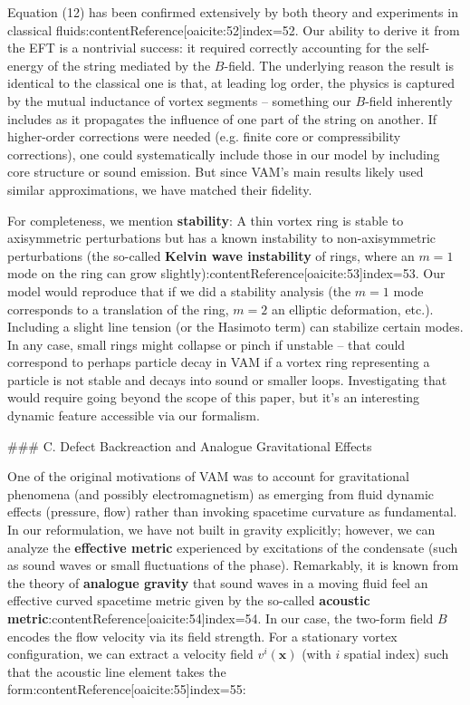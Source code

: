 \documentclass[12pt]{article}
\begin{document}
Equation (12) has been confirmed extensively by both theory and experiments in classical fluids:contentReference[oaicite:52]{index=52}. Our ability to derive it from the EFT is a nontrivial success: it required correctly accounting for the self-energy of the string mediated by the $B$-field. The underlying reason the result is identical to the classical one is that, at leading log order, the physics is captured by the mutual inductance of vortex segments – something our $B$-field inherently includes as it propagates the influence of one part of the string on another. If higher-order corrections were needed (e.g. finite core or compressibility corrections), one could systematically include those in our model by including core structure or sound emission. But since VAM’s main results likely used similar approximations, we have matched their fidelity.

For completeness, we mention \textbf{stability}: A thin vortex ring is stable to axisymmetric perturbations but has a known instability to non-axisymmetric perturbations (the so-called \textbf{Kelvin wave instability} of rings, where an $m=1$ mode on the ring can grow slightly):contentReference[oaicite:53]{index=53}. Our model would reproduce that if we did a stability analysis (the $m=1$ mode corresponds to a translation of the ring, $m=2$ an elliptic deformation, etc.). Including a slight line tension (or the Hasimoto term) can stabilize certain modes. In any case, small rings might collapse or pinch if unstable – that could correspond to perhaps particle decay in VAM if a vortex ring representing a particle is not stable and decays into sound or smaller loops. Investigating that would require going beyond the scope of this paper, but it’s an interesting dynamic feature accessible via our formalism.

### C. Defect Backreaction and Analogue Gravitational Effects

One of the original motivations of VAM was to account for gravitational phenomena (and possibly electromagnetism) as emerging from fluid dynamic effects (pressure, flow) rather than invoking spacetime curvature as fundamental. In our reformulation, we have not built in gravity explicitly; however, we can analyze the \textbf{effective metric} experienced by excitations of the condensate (such as sound waves or small fluctuations of the phase). Remarkably, it is known from the theory of \textbf{analogue gravity} that sound waves in a moving fluid feel an effective curved spacetime metric given by the so-called \textbf{acoustic metric}:contentReference[oaicite:54]{index=54}. In our case, the two-form field $B$ encodes the flow velocity via its field strength. For a stationary vortex configuration, we can extract a velocity field $v^i(\mathbf{x})$ (with $i$ spatial index) such that the acoustic line element takes the form:contentReference[oaicite:55]{index=55}:
\end{document}

